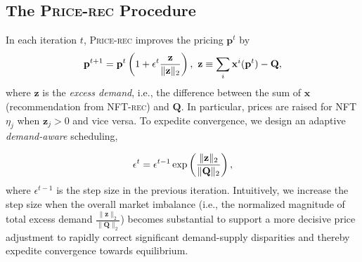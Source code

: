 \documentclass[conference]{IEEEtran}
\theoremstyle{plain}
\newcommand*{\defeq}{\equiv}
\begin{document}
\subsection{The \textsc{Price-rec}\xspace Procedure}
\label{subsec:findprice}

In each iteration $t$, \textsc{Price-rec}\xspace improves the pricing $\mathbf{p}^t$ by 
\begin{equation}\small
        \label{eqn:update-rule}
        \mathbf{p}^{t+1} = \mathbf{p}^t\left(1 + \epsilon^t\frac{\mathbf{z}}{\lVert\mathbf{z}\rVert_2}\right),\,\,
        \mathbf{z} \defeq \sum_i \mathbf{x}^i(\mathbf{p}^t) - \mathbf{Q},
    \end{equation}    
    where $\mathbf{z}$ is the \emph{excess demand}, i.e., the difference between the sum of $\mathbf{x}$ (recommendation from \textsc{NFT-rec}\xspace) and $\mathbf{Q}$. In particular, prices are raised for NFT $\eta_j$ when $\mathbf{z}_j>0$ and vice versa. To expedite convergence, we design an adaptive \emph{demand-aware} scheduling, 

    \begin{equation}\small
    \label{eqn:ba-stepsize}
        \epsilon^t = \epsilon^{t-1} \exp\left(
        \frac{\lVert\mathbf{z}\rVert_2}{\lVert\mathbf{Q}\rVert_2}
        \right),
    \end{equation}
    where $\epsilon^{t-1}$ is the step size in the previous iteration. 
    Intuitively, we increase the step size when the overall market imbalance (i.e., the normalized magnitude of total excess demand $\frac{\lVert\mathbf{z}\rVert_2}{\lVert\mathbf{Q}\rVert_2}$) becomes substantial to support a more decisive price adjustment to rapidly correct significant demand-supply disparities and thereby expedite convergence towards equilibrium.
    
\end{document}

